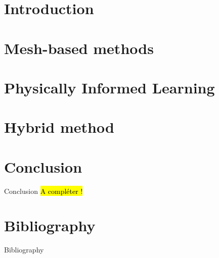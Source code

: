 \documentclass[compress,10pt,xcolor={table,dvipsnames},t]{beamer}
\begin{document}
	\section{Introduction}
	
	
	\section{Mesh-based methods}
	
	
	\section{Physically Informed Learning}
	
	
	\section{Hybrid method}
	
	
	
%	
%	
%	
	
	\section{Conclusion} %
	
	\begin{frame}[label={lastslide}]{Conclusion}
		\hl{A compléter !}
	\end{frame}
	
	\section{Bibliography}
	
	{ 
		\begin{frame}{Bibliography}
			\small
			\printbibliography[heading=none]
		\end{frame}
	}
	\addtocounter{framenumber}{-1} 
	
	\appendix
	
	
	
\end{document}
